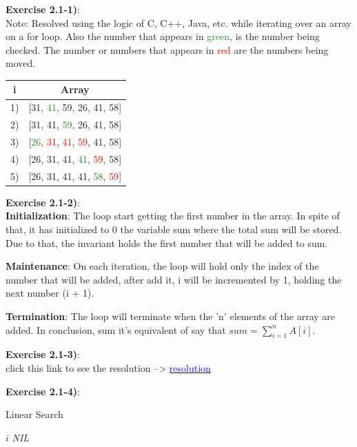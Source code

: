 \documentclass{article}
\newcounter{exercise}[section]   %
\begin{document}
\textbf{Exercise 2.1-1)}:\\
Note: Resolved using the logic of C, C++, Java, etc. while iterating over an array on a for
loop. Also the number that appears in \textcolor{ForestGreen}{green}, is the number being 
checked. The number or numbers that appears in \textcolor{Red}{red} are the numbers being 
moved.

\begin{center}
    \begin{tabular}{|c|c|}
    \hline
    \textbf{i} & \textbf{Array} \\
    \hline
    1) & [31, \textcolor{ForestGreen}{41}, 59, 26, 41, 58]\\
    2) & [31, 41, \textcolor{ForestGreen}{59}, 26, 41, 58]\\
    3) & [\textcolor{ForestGreen}{26}, \textcolor{Red}{31}, \textcolor{Red}{41}, 
          \textcolor{Red}{59}, 41, 58]\\
    4) & [26, 31, 41, \textcolor{ForestGreen}{41}, \textcolor{Red}{59}, 58]\\
    5) & [26, 31, 41, 41, \textcolor{ForestGreen}{58}, \textcolor{Red}{59}]\\
    \hline
    \end{tabular}
\end{center}

\textbf{Exercise 2.1-2)}:\\
\textbf{Initialization}: The loop start getting the first number in the array. In spite of 
that, it has initialized to 0 the variable sum where the total sum will be stored. Due to 
that, the invariant holds the first number that will be added to sum.

\textbf{Maintenance}: On each iteration, the loop will hold only the index of the number 
that will be added, after add it, i will be incremented by 1, holding the next number (i + 1).

\textbf{Termination}: The loop will terminate when the 'n' elements of the array are added. In conclusion,
sum it's equivalent of say that $sum = \sum_{i = 1}^{n} A[i]$.
    
\textbf{Exercise 2.1-3)}:\\
click this link to see the resolution --> \href{https://github.com/Graburr/Algorithms_CLRS_4ed_solutions/blob/main/chapter1/Getting_Started/2.1-3.cpp}
{\textcolor{blue}{resolution}}

\textbf{Exercise 2.1-4)}:\\
\begin{algorithm}
\caption{Linear Search}\label{linearSearchID}
\begin{algorithmic}[1]
            \Return $i$
        \EndIf
    \EndFor
    \State \Return \textit{NIL}
\EndFunction
\end{algorithmic}
\end{algorithm}
\end{document}
